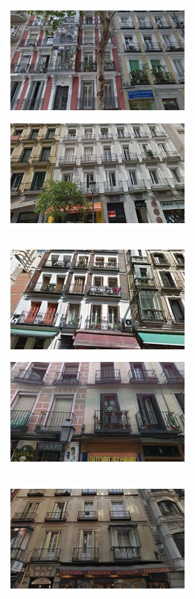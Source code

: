 \begin{figure}
  \begin{minipage}{\linewidth}
    \begin{minipage}{0.3\linewidth}
      \includegraphics[width=0.49\linewidth]{imgs/arch/mosaicsS2/mosaic0000.jpg}
      \includegraphics[width=0.49\linewidth]{imgs/arch/mosaicsS2/mosaic0001.jpg}
      \\ \vspace{-3mm} \\
      \includegraphics[width=0.49\linewidth]{imgs/arch/mosaicsS2/mosaic0002.jpg}
      \includegraphics[width=0.49\linewidth]{imgs/arch/mosaicsS2/mosaic0003.jpg}
      \\ \vspace{-3mm} \\
      \includegraphics[width=0.49\linewidth]{imgs/arch/mosaicsS2/mosaic0004.jpg}

\end{minipage}
\end{minipage}
\end{figure}
